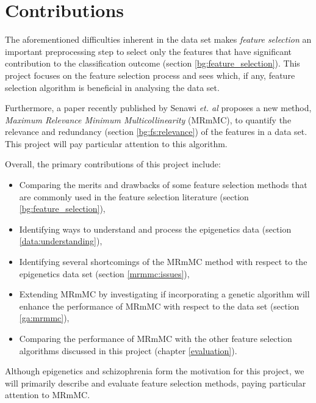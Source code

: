 \documentclass[12pt, twoside, a4paper]{report}
\begin{document}



\section{Contributions}
The aforementioned difficulties inherent in the data set makes \textit{feature selection} an important preprocessing step to select only the features that have significant contribution to the classification outcome (section \ref{bg:feature_selection}). This project focuses on the feature selection process and sees which, if any, feature selection algorithm is beneficial in analysing the data set.

Furthermore, a paper recently published by Senawi \textit{et. al} \cite{RefWorks:187} proposes a new method, \textit{Maximum Relevance Minimum Multicollinearity} (MRmMC), to quantify the relevance and redundancy (section \ref{bg:fs:relevance}) of the features in a data set. This project will pay particular attention to this algorithm.

Overall, the primary contributions of this project include:
\begin{itemize}
  \item Comparing the merits and drawbacks of some feature selection methods that are commonly used in the feature selection literature (section \ref{bg:feature_selection}),
  \item Identifying ways to understand and process the epigenetics data (section \ref{data:understanding}),
  \item Identifying several shortcomings of the MRmMC method with respect to the epigenetics data set (section \ref{mrmmc:issues}),
  \item Extending MRmMC by investigating if incorporating a genetic algorithm will enhance the performance of MRmMC with respect to the data set (section \ref{ga:mrmmc}),
  \item Comparing the performance of MRmMC with the other feature selection algorithms discussed in this project (chapter \ref{evaluation}).
\end{itemize}

Although epigenetics and schizophrenia form the motivation for this project, we will primarily describe and evaluate feature selection methods, paying particular attention to MRmMC.
\end{document}
